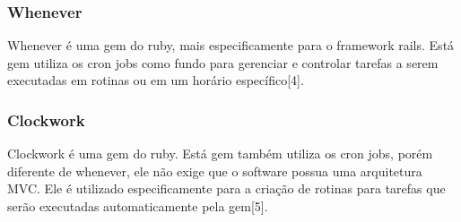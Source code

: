 		\subsubsection*{Whenever}
		Whenever é uma gem do ruby, mais especificamente para o framework rails. Está gem utiliza os cron jobs como fundo para gerenciar e controlar tarefas a serem executadas em rotinas ou em um horário específico[4].
		\subsubsection*{Clockwork}
		Clockwork é uma gem do ruby. Está gem também utiliza os cron jobs, porém diferente de whenever, ele não exige que o software possua uma arquitetura MVC. Ele é utilizado especificamente para a criação de rotinas para tarefas que serão executadas automaticamente pela gem[5].